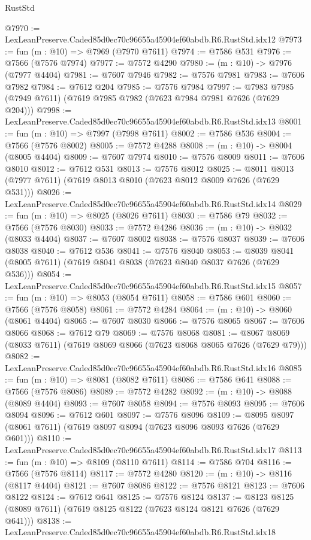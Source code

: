 \begin{lexlean}{RustStd}
\begin{coremodule}
@7970 := LexLeanPreserve.Caded85d0ec70c96655a45904ef60abdb.R6.RustStd.idx12
@7973 := fun (m : @10) => @7969 (@7970 @7611)
@7974 := @7586 @531
@7976 := @7566 (@7576 @7974)
@7977 := @7572 @4290
@7980 := (m : @10) -> @7976 (@7977 @4404)
@7981 := @7607 @7946
@7982 := @7576 @7981
@7983 := @7606 @7982
@7984 := @7612 @204
@7985 := @7576 @7984
@7997 := @7983 @7985 (@7949 @7611) (@7619 @7985 @7982 (@7623 @7984 @7981 @7626 (@7629 @204)))
@7998 := LexLeanPreserve.Caded85d0ec70c96655a45904ef60abdb.R6.RustStd.idx13
@8001 := fun (m : @10) => @7997 (@7998 @7611)
@8002 := @7586 @536
@8004 := @7566 (@7576 @8002)
@8005 := @7572 @4288
@8008 := (m : @10) -> @8004 (@8005 @4404)
@8009 := @7607 @7974
@8010 := @7576 @8009
@8011 := @7606 @8010
@8012 := @7612 @531
@8013 := @7576 @8012
@8025 := @8011 @8013 (@7977 @7611) (@7619 @8013 @8010 (@7623 @8012 @8009 @7626 (@7629 @531)))
@8026 := LexLeanPreserve.Caded85d0ec70c96655a45904ef60abdb.R6.RustStd.idx14
@8029 := fun (m : @10) => @8025 (@8026 @7611)
@8030 := @7586 @79
@8032 := @7566 (@7576 @8030)
@8033 := @7572 @4286
@8036 := (m : @10) -> @8032 (@8033 @4404)
@8037 := @7607 @8002
@8038 := @7576 @8037
@8039 := @7606 @8038
@8040 := @7612 @536
@8041 := @7576 @8040
@8053 := @8039 @8041 (@8005 @7611) (@7619 @8041 @8038 (@7623 @8040 @8037 @7626 (@7629 @536)))
@8054 := LexLeanPreserve.Caded85d0ec70c96655a45904ef60abdb.R6.RustStd.idx15
@8057 := fun (m : @10) => @8053 (@8054 @7611)
@8058 := @7586 @601
@8060 := @7566 (@7576 @8058)
@8061 := @7572 @4284
@8064 := (m : @10) -> @8060 (@8061 @4404)
@8065 := @7607 @8030
@8066 := @7576 @8065
@8067 := @7606 @8066
@8068 := @7612 @79
@8069 := @7576 @8068
@8081 := @8067 @8069 (@8033 @7611) (@7619 @8069 @8066 (@7623 @8068 @8065 @7626 (@7629 @79)))
@8082 := LexLeanPreserve.Caded85d0ec70c96655a45904ef60abdb.R6.RustStd.idx16
@8085 := fun (m : @10) => @8081 (@8082 @7611)
@8086 := @7586 @641
@8088 := @7566 (@7576 @8086)
@8089 := @7572 @4282
@8092 := (m : @10) -> @8088 (@8089 @4404)
@8093 := @7607 @8058
@8094 := @7576 @8093
@8095 := @7606 @8094
@8096 := @7612 @601
@8097 := @7576 @8096
@8109 := @8095 @8097 (@8061 @7611) (@7619 @8097 @8094 (@7623 @8096 @8093 @7626 (@7629 @601)))
@8110 := LexLeanPreserve.Caded85d0ec70c96655a45904ef60abdb.R6.RustStd.idx17
@8113 := fun (m : @10) => @8109 (@8110 @7611)
@8114 := @7586 @704
@8116 := @7566 (@7576 @8114)
@8117 := @7572 @4280
@8120 := (m : @10) -> @8116 (@8117 @4404)
@8121 := @7607 @8086
@8122 := @7576 @8121
@8123 := @7606 @8122
@8124 := @7612 @641
@8125 := @7576 @8124
@8137 := @8123 @8125 (@8089 @7611) (@7619 @8125 @8122 (@7623 @8124 @8121 @7626 (@7629 @641)))
@8138 := LexLeanPreserve.Caded85d0ec70c96655a45904ef60abdb.R6.RustStd.idx18

\end{coremodule}
\end{lexlean}
